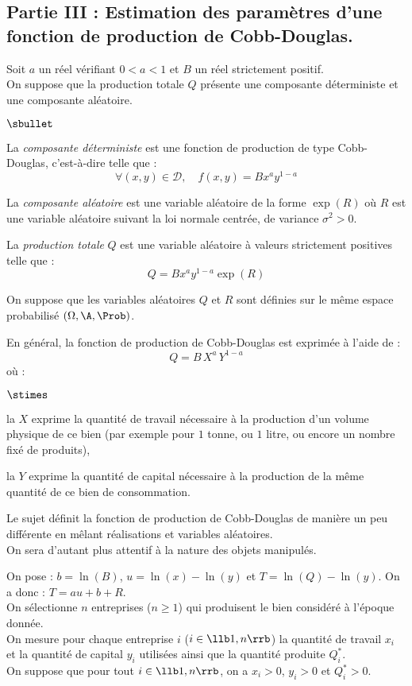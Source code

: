 \subsection*{Partie III : Estimation des paramètres d'une fonction de 
production de Cobb-Douglas.}
\noindent 
Soit $a$ un réel vérifiant $0 < a < 1$ et $B$ un réel 
strictement positif.\\
On suppose que la production totale $Q$ présente une composante 
déterministe et une composante aléatoire.
\begin{noliste}{$\sbullet$}
 \item La {\it composante déterministe} est une fonction de 
 production de type Cobb-Douglas, c'est-à-dire telle que :
 \[
  \forall (x,y) \in \mathcal{D},\quad f(x,y)=Bx^ay^{1-a}
 \]
 
 \item La {\it composante aléatoire} est une variable aléatoire de la 
 forme $\exp(R)$ où $R$ est une variable aléatoire suivant la loi 
 normale centrée, de variance $\sigma^2>0$.
 
 \item La {\it production totale} $Q$ est une variable aléatoire à 
 valeurs strictement positives telle que :
 \[
  Q=Bx^ay^{1-a} \exp(R)
 \]
\end{noliste}
On suppose que les variables aléatoires $Q$ et $R$ sont définies sur 
le même espace probabilisé $(\Omega,\A,\Prob)$.

\begin{remark}
 En général, la fonction de production de Cobb-Douglas est 
 exprimée à l'aide de \var :
 \[
  Q = B \, X^a \, Y^{1-a}
 \]
 où :
 \begin{noliste}{$\stimes$}
  \item la \var $X$ exprime la quantité de travail nécessaire à la
   production d'un volume physique de ce bien (par exemple pour $1$
   tonne, ou $1$ litre, ou encore un nombre fixé de produits),
  \item la \var $Y$ exprime la quantité de capital nécessaire à la
   production de la même quantité de ce bien de consommation.
 \end{noliste}
 Le sujet définit la fonction de production de Cobb-Douglas de
 manière un peu différente en mêlant réalisations et variables 
 aléatoires.\\
 On sera d'autant plus attentif à la nature des objets manipulés.
\end{remark}

\noindent
On pose : $b=\ln(B)$, $u=\ln(x) - \ln(y)$ et $T=\ln(Q)-\ln(y)$. On a 
donc : $T=au+b+R$.\\
On sélectionne $n$ entreprises ($n \geq 1$) qui produisent le bien 
considéré à l'époque donnée.\\
On mesure pour chaque entreprise $i$ ($i \in \llb 1,n \rrb$) la 
quantité de travail $x_i$ et la quantité de capital $y_i$ utilisées
ainsi que la quantité produite $Q_i^*$.\\
On suppose que pour tout $i \in \llb 1,n \rrb$, on a $x_i>0$, $y_i>0$ 
et $Q_i^*>0$.



